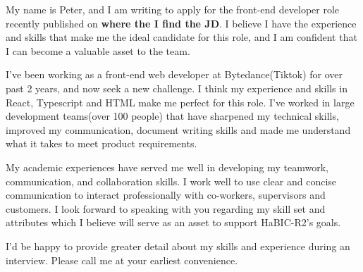 \documentclass[11pt, a4paper]{awesome-cv}
\begin{document}
\makecvheader[C]
\makecvfooter
 {}
  {}
  {}

\begin{cvletter}



My name is Peter, and I am writing to apply for the front-end developer role recently published on \textbf{where the I find the JD}. I believe I have the experience and skills that make me the ideal candidate for this role, and I am confident that I can become a valuable asset to the team.


I've been working as a front-end web developer at Bytedance(Tiktok) for over past 2 years, and now seek a new challenge. I think my experience and skills in React, Typescript and HTML make me perfect for this role. I’ve worked in large development teams(over 100 people) that have sharpened my technical skills, improved my communication, document writing skills and made me understand what it takes to meet product requirements.

My academic experiences have served me well in developing my teamwork, communication, and collaboration skills. I work well to use clear and concise communication to interact professionally with co-workers, supervisors and customers. I look forward to speaking with you regarding my skill set and attributes which I believe will serve as an asset to support HaBIC-R2's goals.




I'd be happy to provide greater detail about my skills and experience during an interview. Please call me at your earliest convenience.



\end{cvletter}




\makeletterclosing
\end{document}
